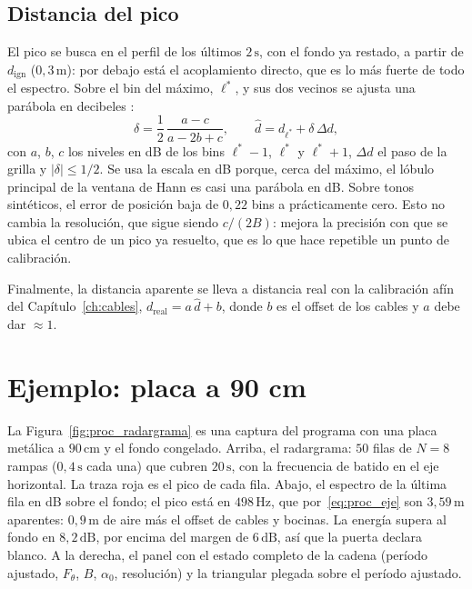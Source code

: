 \subsection{Distancia del pico}

El pico se busca en el perfil de los últimos $2\,\text{s}$, con el fondo ya
restado, a partir de $d_\text{ign}$ ($0{,}3\,\text{m}$): por debajo está el
acoplamiento directo, que es lo más fuerte de todo el espectro. Sobre el
bin del máximo, $\ell^*$, y sus dos vecinos se ajusta una parábola en
decibeles \cite{Jacobsen2007}:
\begin{equation}
  \delta = \frac{1}{2}\,\frac{a - c}{a - 2b + c},
  \qquad
  \hat d = d_{\ell^*} + \delta\,\Delta d,
  \label{eq:proc_parabola}
\end{equation}
con $a$, $b$, $c$ los niveles en dB de los bins $\ell^*-1$, $\ell^*$ y
$\ell^*+1$, $\Delta d$ el paso de la grilla y
$\lvert\delta\rvert \leq 1/2$. Se usa la escala en dB porque, cerca del
máximo, el lóbulo principal de la ventana de Hann es casi una parábola en
dB. Sobre tonos sintéticos, el error de posición baja de $0{,}22$ bins a
prácticamente cero. Esto no cambia la resolución, que sigue siendo
$c/(2B)$: mejora la precisión con que se ubica el centro de un pico ya
resuelto, que es lo que hace repetible un punto de calibración.

Finalmente, la distancia aparente se lleva a distancia real con la
calibración afín del Capítulo~\ref{ch:cables},
$d_\text{real} = a\,\hat d + b$, donde $b$ es el offset de los cables y
$a$ debe dar $\approx 1$.

\section{Ejemplo: placa a 90 cm}
\label{sec:proc_ejemplo}

La Figura~\ref{fig:proc_radargrama} es una captura del programa con una
placa metálica a $90\,\text{cm}$ y el fondo congelado. Arriba, el
radargrama: $50$ filas de $N = 8$ rampas ($0{,}4\,\text{s}$ cada una) que
cubren $20\,\text{s}$, con la frecuencia de batido en el eje horizontal. La
traza roja es el pico de cada fila. Abajo, el espectro de la última fila en
dB sobre el fondo; el pico está en $498\,\text{Hz}$, que
por~\eqref{eq:proc_eje} son $3{,}59\,\text{m}$ aparentes: $0{,}9\,\text{m}$
de aire más el offset de cables y bocinas. La energía supera al fondo en
$8{,}2\,\text{dB}$, por encima del margen de $6\,\text{dB}$, así que la
puerta declara blanco. A la derecha, el panel con el estado completo de la
cadena (período ajustado, $F_\theta$, $B$, $\alpha_0$, resolución) y la
triangular plegada sobre el período ajustado.

